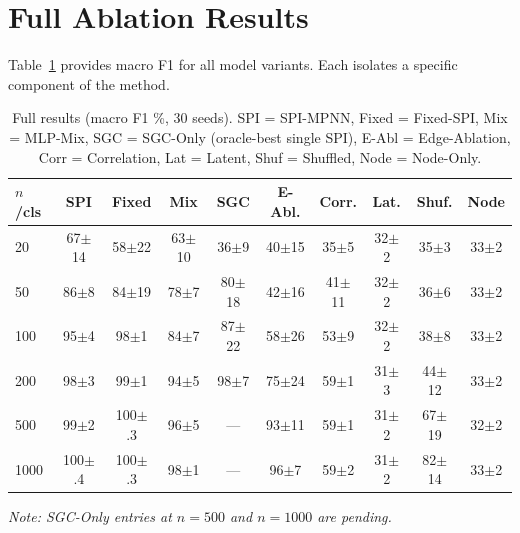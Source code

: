 \documentclass{article}
\begin{document}
\newpage
\appendix
\onecolumn

\section{Full Ablation Results}
\label{app:ablation}

Table~\ref{tab:full} provides macro F1 for all model variants. Each isolates a specific component of the method.

\begin{table}[h]
\caption{Full results (macro F1 \%, 30 seeds). SPI = SPI-MPNN, Fixed = Fixed-SPI, Mix = MLP-Mix, SGC = SGC-Only (oracle-best single SPI), E-Abl = Edge-Ablation, Corr = Correlation, Lat = Latent, Shuf = Shuffled, Node = Node-Only.}
\label{tab:full}
\vskip 0.1in
\begin{center}
\begin{small}
\begin{tabular}{lccccccccc}
\toprule
$n$/cls & SPI & Fixed & Mix & SGC & E-Abl. & Corr. & Lat. & Shuf. & Node \\
\midrule
20   & 67{\scriptsize$\pm$14} & 58{\scriptsize$\pm$22} & 63{\scriptsize$\pm$10} & 36{\scriptsize$\pm$9}  & 40{\scriptsize$\pm$15} & 35{\scriptsize$\pm$5}  & 32{\scriptsize$\pm$2} & 35{\scriptsize$\pm$3} & 33{\scriptsize$\pm$2} \\
50   & 86{\scriptsize$\pm$8}  & 84{\scriptsize$\pm$19} & 78{\scriptsize$\pm$7}  & 80{\scriptsize$\pm$18} & 42{\scriptsize$\pm$16} & 41{\scriptsize$\pm$11} & 32{\scriptsize$\pm$2} & 36{\scriptsize$\pm$6} & 33{\scriptsize$\pm$2} \\
100  & 95{\scriptsize$\pm$4}  & 98{\scriptsize$\pm$1}  & 84{\scriptsize$\pm$7}  & 87{\scriptsize$\pm$22} & 58{\scriptsize$\pm$26} & 53{\scriptsize$\pm$9}  & 32{\scriptsize$\pm$2} & 38{\scriptsize$\pm$8} & 33{\scriptsize$\pm$2} \\
200  & 98{\scriptsize$\pm$3}  & 99{\scriptsize$\pm$1}  & 94{\scriptsize$\pm$5}  & 98{\scriptsize$\pm$7}  & 75{\scriptsize$\pm$24} & 59{\scriptsize$\pm$1}  & 31{\scriptsize$\pm$3} & 44{\scriptsize$\pm$12}& 33{\scriptsize$\pm$2} \\
500  & 99{\scriptsize$\pm$2}  & 100{\scriptsize$\pm$.3}& 96{\scriptsize$\pm$5}  & ---  & 93{\scriptsize$\pm$11}& 59{\scriptsize$\pm$1}  & 31{\scriptsize$\pm$2} & 67{\scriptsize$\pm$19}& 32{\scriptsize$\pm$2} \\
1000 & 100{\scriptsize$\pm$.4}& 100{\scriptsize$\pm$.3}& 98{\scriptsize$\pm$1}  & ---  & 96{\scriptsize$\pm$7} & 59{\scriptsize$\pm$2}  & 31{\scriptsize$\pm$2} & 82{\scriptsize$\pm$14}& 33{\scriptsize$\pm$2} \\
\bottomrule
\end{tabular}
\end{small}
\end{center}
\vskip 0.1in
\textit{Note: SGC-Only entries at $n{=}500$ and $n{=}1000$ are pending.}
\end{table}
\end{document}
